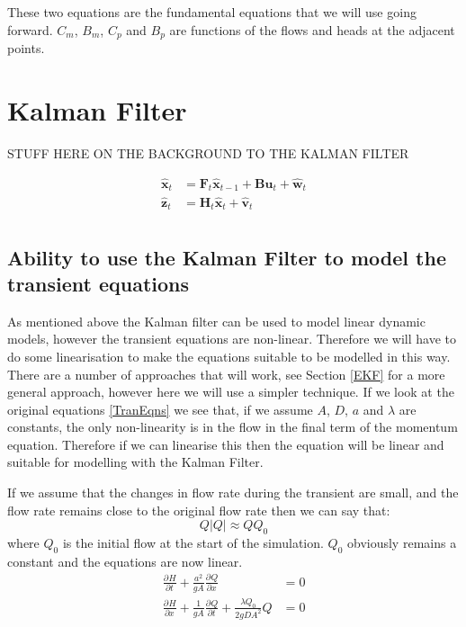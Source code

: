 \documentclass[]{article}
\providecommand{\pdiff}[3]{\frac{\partial^{#3} #1}{\partial #2^{#3}}}
\providecommand{\abs}[1]{\left \lvert#1\right \rvert}
\begin{document}
These two equations are the fundamental equations that we will use going forward. 
$C_m$, $B_m$, $C_p$ and $B_p$ are functions of the flows and heads at the adjacent points.


\section{Kalman Filter}
STUFF HERE ON THE BACKGROUND TO THE KALMAN FILTER

\begin{equation}
\begin{split}
 \mathbf{\hat{x}}_t &= \mathbf{F}_t \mathbf{\hat{x}}_{t-1} + \mathbf{B} \mathbf{u}_t + \mathbf{\hat{w}}_t \\
 \mathbf{\hat{z}}_t &= \mathbf{H}_t \mathbf{\hat{x}}_t + \mathbf{\hat{v}}_t \\
\end{split}
\end{equation}

\subsection{Ability to use the Kalman Filter to model the transient equations}
As mentioned above the Kalman filter can be used to model linear dynamic models, however the transient equations are non-linear.
Therefore we will have to do some linearisation to make the equations suitable to be modelled in this way.
There are a number of approaches that will work, see Section \ref{EKF} for a more general approach, however here we will use a simpler technique.
If we look at the original equations \eqref{TranEqns} we see that, if we assume $A$, $D$, $a$ and $\lambda$ are constants, the only non-linearity is in the flow in the final term of the momentum equation.
Therefore if we can linearise this then the equation will be linear and suitable for modelling with the Kalman Filter.

If we assume that the changes in flow rate during the transient are small, and the flow rate  remains close to the original flow rate then we can say that:
\begin{equation}
 Q\abs{Q} \approx Q Q_0
\end{equation}
where $Q_0$ is the initial flow at the start of the simulation.
$Q_0$ obviously remains a constant and the equations are now linear.
\begin{equation}\label{TranEqnsLinear}
 \begin{split}
 \pdiff{H}{t}{} + \frac{a^2}{gA}\pdiff{Q}{x}{} &= 0 \\
\pdiff{H}{x}{} + \frac{1}{gA}\pdiff{Q}{t}{} + \frac{\lambda Q_0}{2 g DA^2}Q &= 0
 \end{split}
\end{equation}
\end{document}
